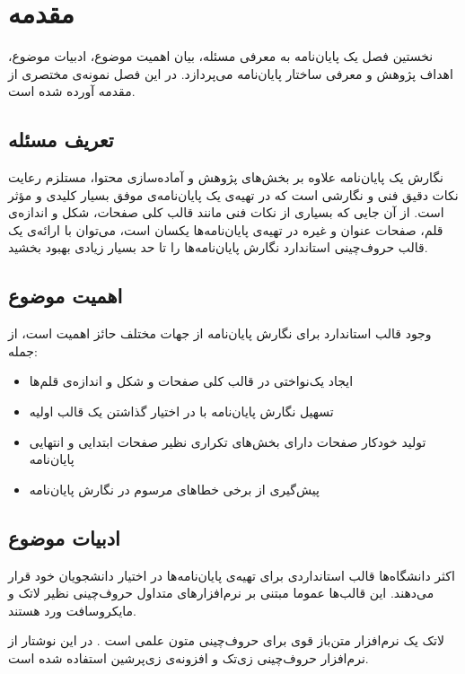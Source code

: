 
\chapter{مقدمه}

نخستین فصل یک پایان‌نامه به معرفی مسئله، بیان اهمیت موضوع، ادبیات موضوع،
اهداف پژوهش و معرفی ساختار پایان‌نامه می‌پردازد.
در این فصل نمونه‌ی مختصری از مقدمه آورده شده است.

\section{تعریف مسئله}

نگارش یک پایان‌نامه‌ علاوه بر بخش‌های پژوهش و آماده‌سازی محتوا،
مستلزم رعایت نکات دقیق فنی و نگارشی است 
که در تهیه‌ی یک پایان‌نامه‌ی موفق بسیار کلیدی و مؤثر است.
از آن جایی که بسیاری از نکات فنی مانند قالب کلی صفحات، شکل و اندازه‌ی قلم، 
صفحات عنوان و غیره در تهیه‌ی پایان‌نامه‌ها یکسان است،
می‌توان با ارائه‌ی یک قالب حروف‌چینی استاندارد 
نگارش پایان‌نامه‌ها را تا حد بسیار زیادی بهبود بخشید.

\section{اهمیت موضوع}

وجود قالب استاندارد برای نگارش پایان‌نامه از جهات مختلف حائز اهمیت است، از جمله:

\begin{itemize}
\item
ایجاد یک‌نواختی در قالب کلی صفحات و شکل و اندازه‌ی قلم‌ها
\item
تسهیل نگارش پایان‌نامه با در اختیار گذاشتن یک قالب اولیه 
\item
تولید خودکار صفحات دارای بخش‌های تکراری نظیر صفحات ابتدایی و انتهایی پایان‌نامه
\item
پیش‌گیری از برخی خطاهای مرسوم در نگارش پایان‌نامه
\end{itemize}

\section{ادبیات موضوع}

اکثر دانشگاه‌ها قالب استانداردی برای تهیه‌ی پایان‌نامه‌ها در اختیار دانشجویان خود قرار می‌دهند.
این قالب‌ها عموما مبتنی بر نرم‌افزارهای متداول حروف‌چینی نظیر لاتک و مایکروسافت ورد هستند.

 لاتک\LTRfootnote{\LaTeX} یک نرم‌افزار متن‌باز قوی برای حروف‌چینی متون علمی است \cite
 {knuth1984texbook, lamport1985LaTeX}.
در این نوشتار از نرم‌افزار حروف‌چینی زی‌تک\LTRfootnote{\XeTeX} 
 و افزونه‌ی زی‌پرشین\LTRfootnote{\XePersian}
 استفاده شده است.


